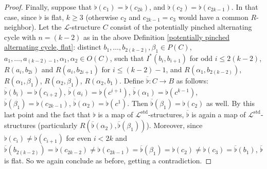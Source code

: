 \documentclass{amsart}
\theoremstyle{definition}
\theoremstyle{remark}
\numberwithin{equation}{section}
\begin{document}
\begin{proof}
    Finally, suppose that $\flat(c_1) = \flat(c_{2k})$, and $\flat(c_2) = \flat(c_{2k-1})$. In that case, since $\flat$ is flat, $k \geq 3$ (otherwise $c_2$ and $c_{2k-1} = c_{3}$ would have a common $R$-neighbor). Let the $\mathcal{L}$-structure $C$ consist of the potentially pinched alternating cycle with $n = (k-2)$ as in the above Definition \ref{potentially pinched alternating cycle, flat}: distinct  $b_{1}, \ldots, b_{2(k-2)}, \beta_1 \in P(C)$, $a_1, \ldots, a_{(k-2)-1}, \alpha_1, \alpha_2 \in O(C)$, such that  $I^{*}(b_i, b_{i+1} )$ for odd $i \leq 2(k-2)$, $R(a_i, b_{2i})$ and $R(a_i, b_{2i+1})$ for $i \leq (k-2)-1$, and $R(\alpha_{1}, b_{2(k-2)})$, $R(\alpha_1, \beta_1)$, $R(\alpha_2, \beta_1)$, $R(\alpha_2, b_1)$. Define $\overline{\flat}: C \to B$ as follows: $\overline{\flat}(b_i)= \flat(c_{i+2})$, $\overline{\flat}(a_i)=\flat(c^{i+1})$, $\overline{\flat}(\alpha_1)= \flat(c^{k-1})$, $\overline{\flat}(\beta_1)= \flat(c_{2k-1})$, $\overline{\flat}(\alpha_{2})=\flat(c^1)$. Then $\overline{\flat}(\beta_1)=\flat(c_2)$ as well. By this last point and the fact that $\flat$ is a map of $\mathcal{L}^{\mathrm{std}}$-structures, $\overline{\flat}$ is again a map of $\mathcal{L}^{\mathrm{std}}$-structures (particularly $R(\overline{\flat}(\alpha_{2}),\overline{\flat}(\beta_1))$). Moreover, since $\flat(c_i) \neq \flat(c_{i+1}) $ for even $i < 2k$ and $\overline{\flat}(b_{2(k-2)})=\flat(c_{2k-2}) \neq \flat(c_{2k-1}) = \overline{\flat}(\beta_1)=\flat(c_2) \neq \flat(c_{3})=\overline{\flat}(b_1)$, $\overline{\flat}$ is flat. So we again conclude as before, getting a contradiction. 



\end{proof}
\end{document}
